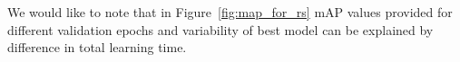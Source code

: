 We would like to note that in Figure~\ref{fig:map_for_rs} mAP values provided for different validation epochs and variability of best model can be explained by difference in total learning time.

